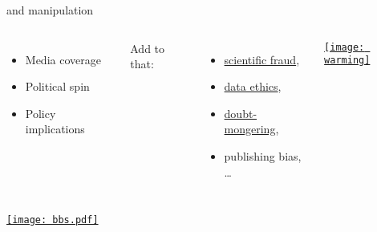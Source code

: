 \documentclass[t]{beamer}
\begin{document}
  \begin{frame}[t]{ and manipulation}

    \begin{columns}[T]
      

      \begin{itemize}
        \item Media coverage        %
        \item Political spin        %
        \item Policy implications   %
      \end{itemize}
      
      Add to that:
      
      \begin{itemize}
        \item \href{http://andrewgelman.com/2012/08/scientific-fraud-double-standards-and-institutions-protecting-themselves/}{scientific fraud},
        \item \href{http://andrewgelman.com/2012/10/ethical-standards-in-different-data-communities/}{data ethics}, %
        \item \href{https://en.wikipedia.org/wiki/Merchants_of_Doubt}{doubt-mongering}, %
        \item publishing bias, … %
      \end{itemize}
              
        
        \href{https://metofficenews.wordpress.com/2010/07/28/unmistakable-signs-of-a-warming-world/}%
        {\texttt{[image: warming]}}

    \end{columns}
    
  \end{frame}
    
  \begin{frame}[c, plain]
    
    \href{http://www2.psych.ubc.ca/~henrich/pdfs/WeirdPeople.pdf}{\texttt{[image: bbs.pdf]}}  

  \end{frame}

  \begin{frame}[c, plain]{}
  \end{frame} 
  
\end{document}
